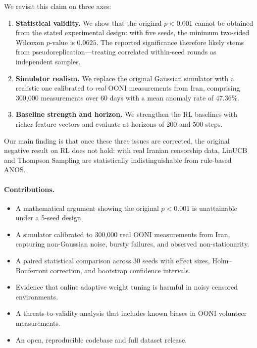 \documentclass[11pt,a4paper]{article}
\begin{document}
We revisit this claim on three axes:

\begin{enumerate}[leftmargin=*]
  \item \textbf{Statistical validity.} We show that the original
  $p < 0.001$ cannot be obtained from the stated experimental design:
  with five seeds, the minimum two-sided Wilcoxon $p$-value is
  $0.0625$. The reported significance therefore likely stems from
  pseudoreplication---treating correlated within-seed rounds as
  independent samples.
  \item \textbf{Simulator realism.} We replace the original Gaussian
  simulator with a realistic one calibrated to \emph{real} OONI
  measurements from Iran, comprising 300{,}000 measurements over
  60 days with a mean anomaly rate of $47.36\%$.
  \item \textbf{Baseline strength and horizon.} We strengthen the
  RL baselines with richer feature vectors and evaluate at horizons
  of 200 and 500 steps.
\end{enumerate}

Our main finding is that once these three issues are corrected, the
original negative result on RL does not hold: with real Iranian
censorship data, LinUCB and Thompson Sampling are statistically
indistinguishable from rule-based ANOS.

\paragraph{Contributions.}
\begin{itemize}[leftmargin=*]
  \item A mathematical argument showing the original $p<0.001$ is
  unattainable under a 5-seed design.
  \item A simulator calibrated to 300{,}000 real OONI measurements
  from Iran, capturing non-Gaussian noise, bursty failures, and
  observed non-stationarity.
  \item A paired statistical comparison across 30 seeds with effect
  sizes, Holm--Bonferroni correction, and bootstrap confidence
  intervals.
  \item Evidence that online adaptive weight tuning is harmful in
  noisy censored environments.
  \item A threats-to-validity analysis that includes known biases
  in OONI volunteer measurements.
  \item An open, reproducible codebase and full dataset release.
\end{itemize}
\end{document}
